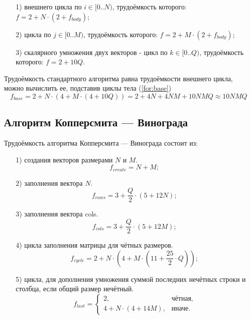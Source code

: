 \documentclass[12pt]{report}
\begin{document}
	\begin{enumerate}
		\item[1)] внешнего цикла по $i \in [0..N)$, трудоёмкость которого: $f = 2 + N \cdot (2 + f_{body})$;
		\item[2)] цикла по $j \in [0..M)$, трудоёмкость которого: $f = 2 + M \cdot (2 + f_{body})$;
		\item[3)] скалярного умножения двух векторов - цикл по $k \in [0..Q)$, трудоёмкость которого: $f = 2 + 10Q$.
	\end{enumerate}
	
	Трудоёмкость стандартного алгоритма равна трудоёмкости внешнего цикла, можно вычислить ее, подставив циклы тела (\ref{for:base})
	\begin{equation}
		\label{for:base}
		f_{base} = 2 + N \cdot (4 + M \cdot (4 + 10Q)) = 2 + 4N + 4NM + 10NMQ \approx 10NMQ
	\end{equation}
	
	\subsection{Алгоритм Копперсмита — Винограда}

	Трудоёмкость алгоритма Копперсмита — Винограда состоит из:

	\begin{enumerate}
		\item[1)] создания векторов размерами $N$ и $M$.
		\begin{equation}
		\label{for:init}
		f_{create} = N + M;
		\end{equation}
		
		\item[2)] заполнения вектора $N$.
		\begin{equation}
		\label{for:MH}
		f_{rows} = 3 + \frac{Q}{2} \cdot (5 + 12N);
		\end{equation}
		
		\item[3)] заполнения вектора cols.
		\begin{equation}
		\label{for:MV}
		f_{cols} = 3 + \frac{Q}{2} \cdot (5 + 12M);
		\end{equation}
		
		\item[4)] цикла заполнения матрицы для чётных размеров.
		\begin{equation}
		\label{for:cycle}
		f_{cycle} = 2 + N \cdot (4 + M \cdot (11 + \frac{25}{2} \cdot Q));
		\end{equation}
		
		\item[5)] цикла, для дополнения умножения суммой последних нечётных строки и столбца, если общий размер нечётный.
		\begin{equation}
		\label{for:last}
		f_{last} = \begin{cases}
		2, & \text{чётная,}\\
		4 + N \cdot (4 + 14M), & \text{иначе.}
		\end{cases}
		\end{equation}
	\end{enumerate}
\end{document}
